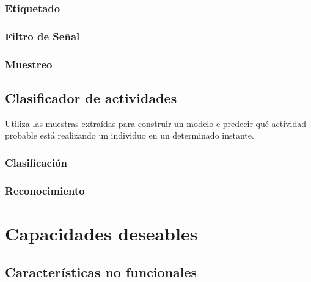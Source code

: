 \subsubsection{Etiquetado}

\subsubsection{Filtro de Señal}

\subsubsection{Muestreo}

\subsection{Clasificador de actividades}

\label{sec423:clasificador}Utiliza las muestras extraídas para construir
un modelo e predecir qué actividad probable está realizando un individuo
en un determinado instante.

\subsubsection{Clasificación}

\subsubsection{Reconocimiento}

\section{Capacidades deseables}

\subsection{Características no funcionales}

